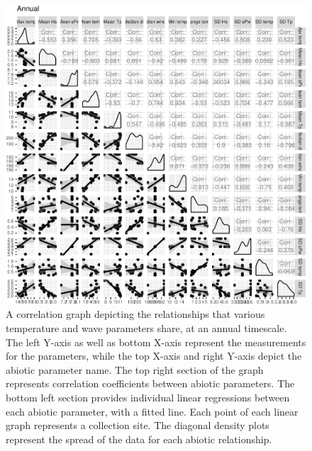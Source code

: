 \documentclass[10pt,a4,]{article}
\makeatletter
\def\maxwidth{\ifdim\Gin@nat@width>\linewidth\linewidth
\else\Gin@nat@width\fi}
\let\Oldincludegraphics\includegraphics
\renewcommand{\includegraphics}[1]{\Oldincludegraphics[width=\maxwidth]{#1}}
\makeatother
\begin{document}
\begin{figure}
\centering
\includegraphics{chapter_2_files/figure-latex/unnamed-chunk-21-1.pdf}
\caption{A correlation graph depicting the relationships that various
temperature and wave parameters share, at an annual timescale. The left
Y-axis as well as bottom X-axis represent the measurements for the
parameters, while the top X-axis and right Y-axis depict the abiotic
parameter name. The top right section of the graph represents
correlation coefficients between abiotic parameters. The bottom left
section provides individual linear regressions between each abiotic
parameter, with a fitted line. Each point of each linear graph
represents a collection site. The diagonal density plots represent the
spread of the data for each abiotic relationship.}
\end{figure}
\end{document}
